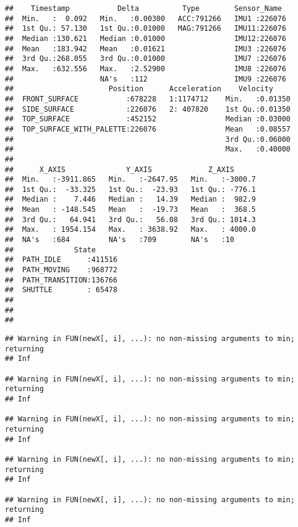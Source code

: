 \documentclass[]{article}
\newenvironment{Shaded}{\begin{snugshade}}{\end{snugshade}}
\newcommand{\KeywordTok}[1]{\textcolor[rgb]{0.13,0.29,0.53}{\textbf{#1}}}
\newcommand{\NormalTok}[1]{#1}
\newcommand{\OperatorTok}[1]{\textcolor[rgb]{0.81,0.36,0.00}{\textbf{#1}}}
\begin{document}
\begin{verbatim}
##    Timestamp           Delta          Type        Sensor_Name   
##  Min.   :  0.092   Min.   :0.00300   ACC:791266   IMU1 :226076  
##  1st Qu.: 57.130   1st Qu.:0.01000   MAG:791266   IMU11:226076  
##  Median :130.621   Median :0.01000                IMU12:226076  
##  Mean   :183.942   Mean   :0.01621                IMU3 :226076  
##  3rd Qu.:268.055   3rd Qu.:0.01000                IMU7 :226076  
##  Max.   :632.556   Max.   :2.52900                IMU8 :226076  
##                    NA's   :112                    IMU9 :226076  
##                      Position      Acceleration    Velocity      
##  FRONT_SURFACE           :678228   1:1174712    Min.   :0.01350  
##  SIDE_SURFACE            :226076   2: 407820    1st Qu.:0.01350  
##  TOP_SURFACE             :452152                Median :0.03000  
##  TOP_SURFACE_WITH_PALETTE:226076                Mean   :0.08557  
##                                                 3rd Qu.:0.06000  
##                                                 Max.   :0.40000  
##                                                                  
##      X_AXIS              Y_AXIS             Z_AXIS       
##  Min.   :-3911.865   Min.   :-2647.95   Min.   :-3000.7  
##  1st Qu.:  -33.325   1st Qu.:  -23.93   1st Qu.: -776.1  
##  Median :    7.446   Median :   14.39   Median :  982.9  
##  Mean   : -148.545   Mean   :  -19.73   Mean   :  368.5  
##  3rd Qu.:   64.941   3rd Qu.:   56.08   3rd Qu.: 1014.3  
##  Max.   : 1954.154   Max.   : 3638.92   Max.   : 4000.0  
##  NA's   :684         NA's   :709        NA's   :10       
##              State       
##  PATH_IDLE      :411516  
##  PATH_MOVING    :968772  
##  PATH_TRANSITION:136766  
##  SHUTTLE        : 65478  
##                          
##                          
## 
\end{verbatim}

\begin{Shaded}
\end{Shaded}

\begin{verbatim}
## Warning in FUN(newX[, i], ...): no non-missing arguments to min; returning
## Inf

## Warning in FUN(newX[, i], ...): no non-missing arguments to min; returning
## Inf

## Warning in FUN(newX[, i], ...): no non-missing arguments to min; returning
## Inf

## Warning in FUN(newX[, i], ...): no non-missing arguments to min; returning
## Inf

## Warning in FUN(newX[, i], ...): no non-missing arguments to min; returning
## Inf
\end{verbatim}
\end{document}
